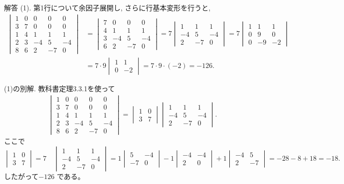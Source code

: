 \documentclass[dvipdfmx,a4paper,11pt]{article} %
\theoremstyle{definition}
\begin{document}
\begin{enumerate}[label=\textbf{問題}\arabic*.]
解答 (1).
第1行について余因子展開し, さらに行基本変形を行うと,
\[
\begin{aligned}
\begin{vmatrix}
1&0&0&0&0\\
3&7&0&0&0\\
1&4&1&1&1\\
2&3&-4&5&-4\\
8&6&2&-7&0
\end{vmatrix}
&=
\begin{vmatrix}
7&0&0&0\\
4&1&1&1\\
3&-4&5&-4\\
6&2&-7&0
\end{vmatrix}
=
7
\begin{vmatrix}
1&1&1\\
-4&5&-4\\
2&-7&0
\end{vmatrix}
=
7
\begin{vmatrix}
1&1&1\\
0&9&0\\
0&-9&-2
\end{vmatrix}\\
&=
7\cdot 9
\begin{vmatrix}
1&1\\
0&-2
\end{vmatrix}
=
7\cdot 9\cdot(-2)
=
-126.
\end{aligned}
\]

(1)の別解. 
教科書定理3.3.1を使って
\begin{align*}
&\begin{vmatrix}
1&0&0&0&0\\
3&7&0&0&0\\
1&4&1&1&1\\
2&3&-4&5&-4\\
8&6&2&-7&0
\end{vmatrix}
=
\begin{vmatrix}
1&0\\
3&7
\end{vmatrix}
\begin{vmatrix}
1&1&1\\
-4&5&-4\\
2&-7&0
\end{vmatrix}.
\end{align*}
ここで
\[
\begin{vmatrix}
1&0\\
3&7
\end{vmatrix}=7
\quad
\begin{vmatrix}
1&1&1\\
-4&5&-4\\
2&-7&0
\end{vmatrix}
=1\begin{vmatrix}5&-4\\-7&0\end{vmatrix}
-1\begin{vmatrix}-4&-4\\2&0\end{vmatrix}
+1\begin{vmatrix}-4&5\\2&-7\end{vmatrix}
=-28-8+18
=-18.
\]
したがって$-126$
である。


\end{enumerate}
\end{document}
